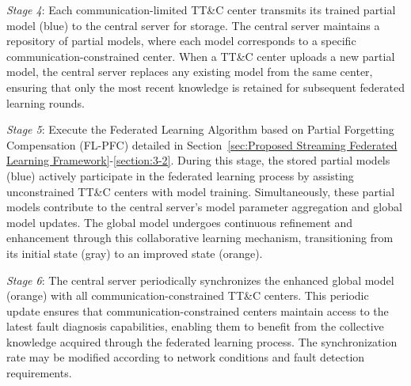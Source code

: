 \textit{Stage 4}: Each communication-limited TT\&C center transmits its trained partial model (blue) to the central server for storage. 
The central server maintains a repository of partial models, where each model corresponds to a specific communication-constrained center. 
When a TT\&C center uploads a new partial model, the central server replaces any existing model from the same center, 
ensuring that only the most recent knowledge is retained for subsequent federated learning rounds.

\textit{Stage 5}: Execute the Federated Learning Algorithm based on Partial Forgetting Compensation 
(FL-PFC) detailed in Section~\ref{sec:Proposed Streaming Federated Learning Framework}-\ref{section:3-2}. 
During this stage, the stored partial models (blue) actively participate in the federated learning process 
by assisting unconstrained TT\&C centers with model training. 
Simultaneously, these partial models contribute to the central server's model parameter aggregation and global model updates. 
The global model undergoes continuous refinement and enhancement through this collaborative learning mechanism, 
transitioning from its initial state (gray) to an improved state (orange).

\textit{Stage 6}: The central server periodically synchronizes the enhanced global model (orange) with all communication-constrained TT\&C centers. 
This periodic update ensures that communication-constrained centers maintain access to the latest fault diagnosis capabilities, 
enabling them to benefit from the collective knowledge acquired through the federated learning process. 
The synchronization rate may be modified according to network conditions and fault detection requirements.


